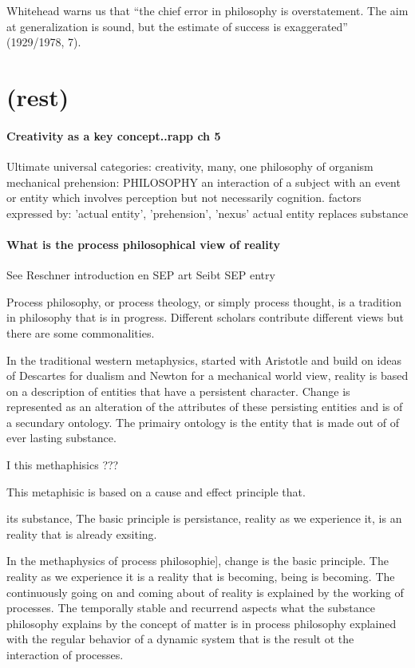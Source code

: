 \documentclass[a4paper]{Thesis}
\begin{document}
Whitehead warns us that “the chief error in philosophy is overstatement.
The aim at generalization is sound, but the estimate of success is exaggerated”
(1929/1978, 7).

\section{(rest)}
\paragraph{Creativity as a key concept..rapp ch 5}
\cite[ch 5]{rapp1990whitehead}
Ultimate universal categories: creativity, many, one
philosophy of organism
mechanical 
prehension: PHILOSOPHY
an interaction of a subject with an event or entity which involves perception but not necessarily cognition.
factors expressed by: 'actual entity', 'prehension', 'nexus'
actual entity replaces substance

\paragraph{What is the process philosophical view of reality}
See Reschner introduction en SEP art \cite{Rescher-2012-sep}
Seibt SEP entry \cite{Seibt-2013-sep}


Process philosophy, or process theology, or simply process thought, is a tradition in philosophy that is in progress. Different scholars contribute different views but there are some commonalities.

In the traditional western metaphysics, started with Aristotle and build on ideas of Descartes for dualism and Newton for a mechanical world view, reality is based on a description of entities that have a persistent character. Change is represented as an alteration of the attributes of these persisting entities and is of a secundary ontology. The primairy ontology is the entity that is made out of of ever lasting substance.

I this methaphisics ???


This metaphisic is based on a cause and effect principle that.

its substance, The basic principle is persistance, reality as we experience it, is an reality that is already exsiting.

In the methaphysics of process philosophie], change is the basic principle. The reality as we experience it is a reality that is becoming, being is becoming.
The continuously going on and coming about of reality is explained by the working of processes. The temporally stable and recurrend aspects what the substance philosophy explains by the concept of matter is in process philosophy explained with the regular behavior of a dynamic system that is the result ot the interaction of processes.
\end{document}
